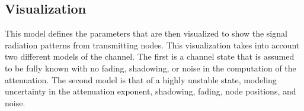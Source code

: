 \subsection{Visualization}
This model defines the parameters that are then visualized to show the signal radiation patterns from transmitting nodes.  This visualization takes into account two different models of the channel.  The first is a channel state that is assumed to be fully known with no fading, shadowing, or noise in the computation of the attenuation.  The second model is that of a highly unstable state, modeling uncertainty in the attenuation exponent, shadowing, fading, node positions, and noise.

\begin{figure} [ht]
\centering
	\subfigure[]{
}
\end{figure}

